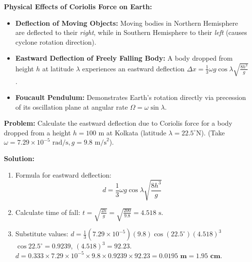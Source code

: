 \documentclass[12pt,a4paper]{article}
\begin{document}
\textbf{Physical Effects of Coriolis Force on Earth:}
\begin{itemize}[leftmargin=*, itemsep=2pt]
  \item \textbf{Deflection of Moving Objects:} Moving bodies in Northern Hemisphere are deflected to their \textit{right}, while in Southern Hemisphere to their \textit{left} (causes cyclone rotation direction).
  \item \textbf{Eastward Deflection of Freely Falling Body:} A body dropped from height $h$ at latitude $\lambda$ experiences an eastward deflection $\Delta x = \frac{1}{3} \omega g \cos \lambda \sqrt{\frac{8h^3}{g}}$.
  \item \textbf{Foucault Pendulum:} Demonstrates Earth's rotation directly via precession of its oscillation plane at angular rate $\Omega = \omega \sin \lambda$.
\end{itemize}

\begin{tcolorbox}[examplebox, title={\textbf{Solved Problem 4: Eastward Deflection Calculation}}]
\textbf{Problem:} Calculate the eastward deflection due to Coriolis force for a body dropped from a height $h = 100\text{ m}$ at Kolkata (latitude $\lambda = 22.5^\circ\text{N}$). (Take $\omega = 7.29 \times 10^{-5}\text{ rad/s}, g = 9.8\text{ m/s}^2$).

\textbf{Solution:}\par\noindent
\begin{enumerate}[leftmargin=*, itemsep=2pt]
  \item Formula for eastward deflection:
   \begin{equation}
   d = \frac{1}{3} \omega g \cos\lambda \sqrt{\frac{8 h^3}{g}}
   \end{equation}
  \item Calculate time of fall: $t = \sqrt{\frac{2h}{g}} = \sqrt{\frac{200}{9.8}} = 4.518\text{ s}$.
  \item Substitute values:
   $d = \frac{1}{3} (7.29 \times 10^{-5}) (9.8) \cos(22.5^\circ) (4.518)^3$
   $\cos 22.5^\circ = 0.9239$, \quad $(4.518)^3 = 92.23$.
   $d = 0.333 \times 7.29 \times 10^{-5} \times 9.8 \times 0.9239 \times 92.23 = \mathbf{0.0195\text{ m} = 1.95\text{ cm}}$.
\end{enumerate}
\end{tcolorbox}

\end{document}
